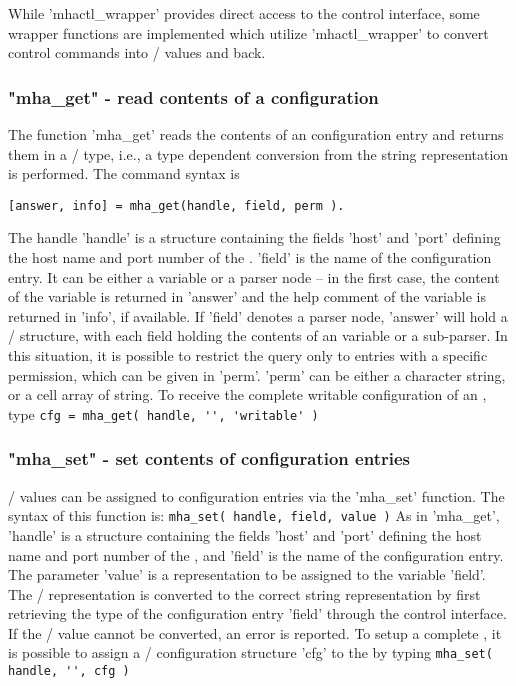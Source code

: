 While 'mhactl\_wrapper' provides direct access to the \mha{} control interface,
some wrapper functions are implemented which utilize 'mhactl\_wrapper' to
convert \mha{} control commands into \Octave{}/ \Matlab{} values and back.

\subsubsection{"mha\_get" - read contents of a \mha configuration}

The function 'mha\_get' reads the contents of an \mha{} configuration
entry and returns them in a \Octave{}/ \Matlab{} type, i.e., a type dependent
conversion from the \mha{} string representation is performed. The
command syntax is
\begin{verbatim}
[answer, info] = mha_get(handle, field, perm ).
\end{verbatim}
The \mha{} handle 'handle' is a structure containing the fields 'host'
and 'port' defining the host name and port number of the \mhad{}.
%
'field' is the name of the \mha{} configuration entry.
%
It can be either a variable or a parser node -- in the first case, the
content of the variable is returned in 'answer' and the help comment
of the variable is returned in 'info', if available.
%
If 'field' denotes a parser node, 'answer' will hold a \Octave{}/ \Matlab{}
structure, with each field holding the contents of an \mha{} variable or a
sub-parser.
%
In this situation, it is possible to restrict the query only to
entries with a specific permission, which can be given in 'perm'.
%
'perm' can be either a character string, or a cell array of string.
%
To receive the complete writable configuration of an \mhad{}, type
\verb!cfg = mha_get( handle, '', 'writable' )!
%

\subsubsection{"mha\_set" - set contents of \mha{} configuration entries}

\Octave{}/ \Matlab{} values can be assigned to \mha{} configuration entries via the
'mha\_set' function.
%
The syntax of this function is:
\verb!mha_set( handle, field, value )!
%
As in 'mha\_get', 'handle' is a structure containing the fields 'host'
and 'port' defining the host name and port number of the \mhad{}, and
'field' is the name of the \mha{} configuration entry.
%
The parameter 'value' is a \Matlab{} representation to be assigned to
the variable 'field'.
%
The \Octave{}/ \Matlab{} representation is converted to the correct \mha{} string
representation by first retrieving the type of the configuration entry
'field' through the control interface.
%
If the \Octave{}/ \Matlab{} value cannot be converted, an error is reported.
%
To setup a complete \mha{}, it is possible to assign a \Octave{}/ \Matlab{}
configuration structure 'cfg' to the \mha{} by typing
\verb!mha_set( handle, '', cfg )!

